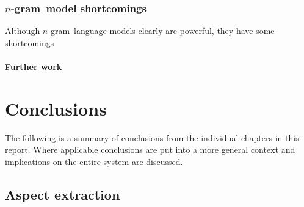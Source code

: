 \documentclass[a4paper,11pt]{kth-mag}
\newcommand{\ngram}{$n$-gram}
\begin{document}



\subsection{\ngram~model shortcomings}
Although \ngram~language models clearly are powerful, they have some shortcomings



\subsubsection{Further work}













\chapter{Conclusions}
The following is a summary of conclusions from the individual chapters in this report. Where applicable conclusions are put into a more general context and implications on the entire system are discussed.

\section{Aspect extraction}
\end{document}
